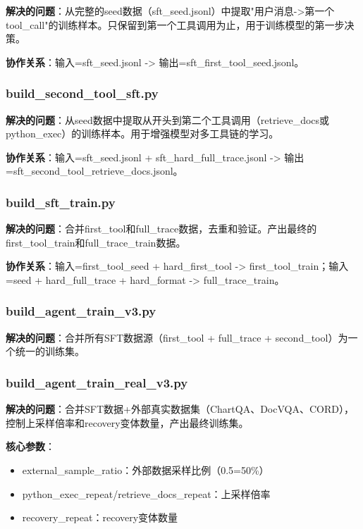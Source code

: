 \documentclass[fontset=none,11pt,a4paper]{ctexart}
\begin{document}
\textbf{解决的问题}：从完整的seed数据（sft\_seed.jsonl）中提取"用户消息->第一个tool\_call"的训练样本。只保留到第一个工具调用为止，用于训练模型的第一步决策。

\textbf{协作关系}：输入=sft\_seed.jsonl -> 输出=sft\_first\_tool\_seed.jsonl。

\subsubsection{build\_second\_tool\_sft.py}

\textbf{解决的问题}：从seed数据中提取从开头到第二个工具调用（retrieve\_docs或python\_exec）的训练样本。用于增强模型对多工具链的学习。

\textbf{协作关系}：输入=sft\_seed.jsonl + sft\_hard\_full\_trace.jsonl -> 输出=sft\_second\_tool\_retrieve\_docs.jsonl。

\subsubsection{build\_sft\_train.py}

\textbf{解决的问题}：合并first\_tool和full\_trace数据，去重和验证。产出最终的first\_tool\_train和full\_trace\_train数据。

\textbf{协作关系}：输入=first\_tool\_seed + hard\_first\_tool -> first\_tool\_train；输入=seed + hard\_full\_trace + hard\_format -> full\_trace\_train。

\subsubsection{build\_agent\_train\_v3.py}

\textbf{解决的问题}：合并所有SFT数据源（first\_tool + full\_trace + second\_tool）为一个统一的训练集。

\subsubsection{build\_agent\_train\_real\_v3.py}

\textbf{解决的问题}：合并SFT数据+外部真实数据集（ChartQA、DocVQA、CORD），控制上采样倍率和recovery变体数量，产出最终训练集。

\textbf{核心参数}：
\begin{itemize}[nosep]
    \item external\_sample\_ratio：外部数据采样比例（0.5=50\%）
    \item python\_exec\_repeat/retrieve\_docs\_repeat：上采样倍率
    \item recovery\_repeat：recovery变体数量
\end{itemize}
\end{document}

